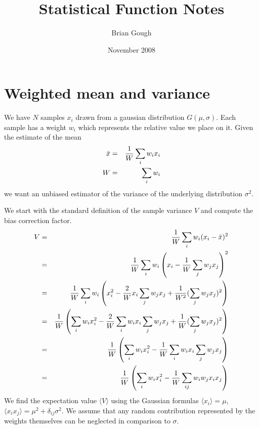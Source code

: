 \documentclass[fleqn,12pt]{article}
\newcommand{\expectation}[1]{\langle #1 \rangle}
\begin{document}
\title{Statistical Function Notes}
\author{Brian Gough}
\date{November 2008}
\maketitle

\section{Weighted mean and variance}
We have $N$ samples $x_i$ drawn from a gaussian distribution
$G(\mu,\sigma)$.  Each sample has a weight $w_i$ which represents the
relative value we place on it.  Given the estimate of the mean
%
\begin{eqnarray}
\bar{x} &=& {1 \over W} \sum_i w_i x_i \\
W       &=& \sum_i w_i
\end{eqnarray}
%
\noindent
we want an unbiased estimator of the variance of the underlying
distribution $\sigma^2$.  

We start with the standard definition of the sample variance $V$ and
compute the bias correction factor.
%
\begin{eqnarray}
V &=& {1\over W} \sum_i w_i (x_i - \bar{x})^2 \\
  &=& {1\over W} \sum_i w_i \left(x_i - {1\over W}\sum_j w_j x_j\right)^2 \\
  &=& {1\over W} \sum_i w_i \left(x_i^2 - {2 \over W} x_i \sum_j w_j x_j 
       + {1 \over W^2} (\sum_j w_j x_j)^2\right) \\
  &=& {1\over W} \left( \sum_i w_i x_i^2 
       - {2 \over W} \sum_i w_i x_i \sum_j w_j x_j
       + {1 \over W} (\sum_j w_j x_j)^2\right)\\
  &=& {1\over W} \left( \sum_i w_i x_i^2 
       - {1 \over W} \sum_i w_i x_i \sum_j w_j x_j\right)\\
  &=& {1\over W} \left( \sum_i w_i x_i^2 
       - {1 \over W} \sum_{ij} w_i w_j x_i x_j\right)
\end{eqnarray}
%
We find the expectation value $\expectation{V}$ using the Gaussian
formulas $\expectation{x_i} = \mu$, $\expectation{x_i x_j} = \mu^2 +
\delta_{ij} \sigma^2$.  We assume that any random contribution
represented by the weights themselves can be neglected in comparison
to $\sigma$.
\end{document}
